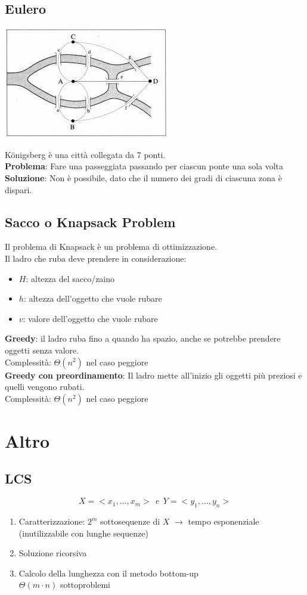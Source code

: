 \documentclass[12pt,a4paper]{article}
\begin{document}
\subsection{Eulero}
\begin{center}
\includegraphics[width=0.4\columnwidth]{img/eulero.jpeg}
\end{center}
K\"onigsberg è una città collegata da 7 ponti.\\
\textbf{Problema}: Fare una passeggiata passando per ciascun ponte una sola volta\\
\textbf{Soluzione}: Non è possibile, dato che il numero dei gradi di ciascuna zona è dispari.\\

\subsection{Sacco o Knapsack Problem}
Il problema di Knapsack è un problema di ottimizzazione.\\
Il ladro che ruba deve prendere in considerazione:
\begin{itemize}
\item $H$: altezza del sacco/zaino
\item $h$: altezza dell'oggetto che vuole rubare
\item $v$:  valore dell'oggetto che vuole rubare
\end{itemize}
\textbf{Greedy}: il ladro ruba fino a quando ha spazio, anche se potrebbe prendere oggetti senza valore.\\
Complessità: $\Theta(n^2)$ nel caso peggiore\\
\textbf{Greedy con preordinamento}: Il ladro mette all'inizio gli oggetti più preziosi e quelli vengono rubati.\\
Complessità: $\Theta(n^2)$ nel caso peggiore

\clearpage
\section{Altro}
\subsection{LCS}
$$X=<x_1, \dots, x_m>\ \ e \ \ Y=<y_1, \dots, y_n>$$
\begin{enumerate}
\item Caratterizzazione: $2^m$ sottosequenze di $X$ $\rightarrow$ tempo esponenziale (inutilizzabile con lunghe sequenze)
\item Soluzione ricorsiva
\item Calcolo della lunghezza con il metodo bottom-up\\
$\Theta(m\cdot n)$ sottoproblemi
\end{enumerate}
\end{document}
